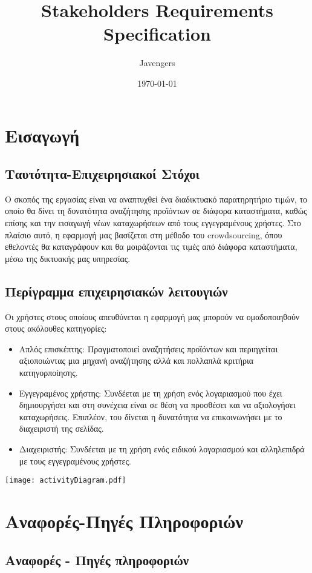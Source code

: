 \documentclass[12pt]{article}
\begin{document}
\title{Stakeholders Requirements Specification}
\date{\today}
\author{Javengers}

\maketitle

\tableofcontents

\section{Εισαγωγή}
\subsection{Ταυτότητα-Επιχειρησιακοί Στόχοι}


Ο σκοπός της εργασίας είναι να αναπτυχθεί ένα διαδικτυακό παρατηρητήριο τιμών, το οποίο θα δίνει τη δυνατότητα αναζήτησης προϊόντων σε διάφορα καταστήματα, καθώς επίσης και την εισαγωγή νέων καταχωρήσεων από τους εγγεγραμένους χρήστες. Στο πλαίσιο αυτό, η εφαρμογή μας βασίζεται στη μέθοδο του crowdsourcing, όπου εθελοντές θα καταγράφουν και θα μοιράζονται τις τιμές από διάφορα καταστήματα, μέσω της δικτυακής μας υπηρεσίας. 

\subsection{Περίγραμμα επιχειρησιακών λειτουγιών}

Οι χρήστες στους οποίους απευθύνεται η εφαρμογή μας μπορούν να ομαδοποιηθούν στους ακόλουθες κατηγορίες:
\begin{itemize}
	\item Απλός επισκέπτης: Πραγματοποιεί αναζητήσεις προϊόντων και περιηγείται αξιοποιώντας μια μηχανή αναζήτησης αλλά και πολλαπλά κριτήρια κατηγορποίησης.
	\item Εγγεγραμένος χρήστης: Συνδέεται με τη χρήση ενός λογαριασμού που έχει δημιουργήσει και στη συνέχεια είναι σε θέση να προσθέσει και να αξιολογήσει καταχωρήσεις. Επιπλέον, του δίνεται η δυνατότητα να επικοινωνήσει με το διαχειριστή της σελίδας.  
	\item Διαχειριστής: Συνδέεται με τη χρήση ενός ειδικού λογαριασμού και αλληλεπιδρά με τους εγγεγραμένους χρήστες.
\end{itemize}

\begin{center}
\texttt{[image: activityDiagram.pdf]}
\end{center}

\section{Αναφορές-Πηγές Πληροφοριών}





\subsection{Αναφορές - Πηγές πληροφοριών}
\end{document}
